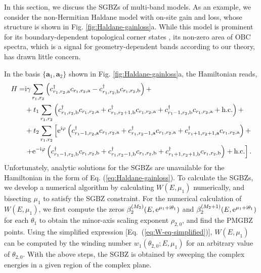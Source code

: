\documentclass[pdflatex,sn-nature, iicol]{sn-jnl}%
\theoremstyle{thmstyleone}%
\theoremstyle{thmstyletwo}%
\theoremstyle{thmstylethree}%
\begin{document}
In this section, we discuss the SGBZs of multi-band models. As an
example, we consider the non-Hermitian Haldane model with on-site
gain and loss, whose structure is shown in Fig. \ref{fig:Haldane-gainloss}a.
While this model is prominent for its boundary-dependent topological
corner states \cite{liGainLossInducedHybridSkinTopological2022,jiangObservationNonHermitianBoundary2024,sunPhotonicFloquetSkinTopological2024,PhysRevLett.133.126601},
its non-zero area of OBC spectra, which is a signal for geometry-dependent
bands according to our theory, has drawn little concern.

In the basis $\{\mathbf{a}_{1},\mathbf{a}_{2}\}$ shown in Fig. \ref{fig:Haldane-gainloss}a,
the Hamiltonian reads, 
\begin{align}
H= & \mathrm{i}\gamma\sum_{r_{1},r_{2}}\left(c_{r_{1},r_{2},\mathrm{a}}^{\dagger}c_{r_{1},r_{2},\mathrm{a}}-c_{r_{1},r_{2},\mathrm{b}}^{\dagger}c_{r_{1},r_{2},\mathrm{b}}\right)+\nonumber \\
 & +t_{1}\sum_{r_{1},r_{2}}\left(c_{r_{1},r_{2},\mathrm{b}}^{\dagger}c_{r_{1},r_{2},\mathrm{a}}+c_{r_{1},r_{2}+1,\mathrm{b}}^{\dagger}c_{r_{1},r_{2},\mathrm{a}}+c_{r_{1}-1,r_{2},\mathrm{b}}^{\dagger}c_{r_{1},r_{2},\mathrm{a}}+\text{h.c.}\right)+\nonumber \\
 & +t_{2}\sum_{r_{1},r_{2}}\left[\mathrm{e}^{\mathrm{i}\varphi}\left(c_{r_{1}-1,r_{2},\mathrm{a}}^{\dagger}c_{r_{1},r_{2},\mathrm{a}}+c_{r_{1},r_{2}-1,\mathrm{a}}^{\dagger}c_{r_{1},r_{2},\mathrm{a}}+c_{r_{1}+1,r_{2}+1,\mathrm{a}}^{\dagger}c_{r_{1},r_{2},\mathrm{a}}\right)+\right.\nonumber \\
 & \left.+\mathrm{e}^{-\mathrm{i}\varphi}\left(c_{r_{1}-1,r_{2},\mathrm{b}}^{\dagger}c_{r_{1},r_{2},\mathrm{b}}+c_{r_{1},r_{2}-1,\mathrm{b}}^{\dagger}c_{r_{1},r_{2},\mathrm{b}}+c_{r_{1}+1,r_{2}+1,\mathrm{b}}^{\dagger}c_{r_{1},r_{2},\mathrm{b}}\right)+\text{h.c.}\right].\label{eq:Haldane-gainloss}
\end{align}
Unfortunately, analytic solutions for the SGBZs are unavailable for
the Hamiltonian in the form of Eq. (\ref{eq:Haldane-gainloss}). To
calculate the SGBZs, we develop a numerical algorithm by calculating
$W(E,\mu_{1})$ numerically, and bisecting $\mu_{1}$ to satisfy the
SGBZ constraint. For the numerical calculation of $W(E,\mu_{1})$,
we first compute the zeros $\beta_{2}^{(M_{2})}(E,\mathrm{e}^{\mu_{1}+\mathrm{i}\theta_{1}})$
and $\beta_{2}^{(M_{2}+1)}(E,\mathrm{e}^{\mu_{1}+\mathrm{i}\theta_{1}})$ for
each $\theta_{1}$ to obtain the minor-axis scaling exponent $\rho_{2,0}$,
and find the PMGBZ points. Using the simplified expression {[}Eq.~(\ref{eq:W-eq-simplified}){]}, $W(E,\mu_{1})$ can be computed by the winding number $w_{1}(\theta_{2,0};E,\mu_{1})$
for an arbitrary value of $\theta_{2,0}$. With the above steps, the
SGBZ is obtained by sweeping the complex energies in a given region
of the complex plane.
\end{document}
